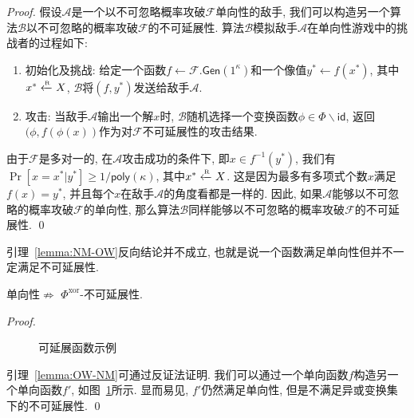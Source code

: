 \begin{proof}
假设$\mathcal{A}$是一个以不可忽略概率攻破$\mathcal{F}$单向性的敌手, 我们可以构造另一个算法$\mathcal{B}$以不可忽略的概率攻破$\mathcal{F}$的不可延展性. 算法$\mathcal{B}$模拟敌手$\mathcal{A}$在单向性游戏中的挑战者的过程如下: 
\begin{enumerate}
\item 初始化及挑战: 给定一个函数$f \leftarrow \mathcal{F}.\mathsf{Gen}(1^\kappa)$和一个像值$y^* \leftarrow f(x^*)$, 其中$x^* \xleftarrow{\textup{\tiny R}} X$, $\mathcal{B}$将$(f, y^*)$发送给敌手$\mathcal{A}$. 

\item 攻击: 当敌手$\mathcal{A}$输出一个解$x$时, $\mathcal{B}$随机选择一个变换函数$\phi \in \Phi \backslash \mathsf{id}$, 返回$(\phi, f(\phi(x))$作为对$\mathcal{F}$不可延展性的攻击结果.   
\end{enumerate}

由于$\mathcal{F}$是多对一的, 在$\mathcal{A}$攻击成功的条件下, 即$x \in f^{-1}(y^*)$, 我们有$\Pr[x = x^* |y^*] \geq 1/\mathsf{poly}(\kappa)$, 其中$x^* \xleftarrow{\textup{\tiny R}} X$. 这是因为最多有多项式个数$x$满足$f(x) = y^*$, 
并且每个$x$在敌手$\mathcal{A}$的角度看都是一样的. 因此, 如果$\mathcal{A}$能够以不可忽略的概率攻破$\mathcal{F}$的单向性, 那么算法$\mathcal{B}$同样能够以不可忽略的概率攻破$\mathcal{F}$的不可延展性. \qed    
\end{proof}

引理~\ref{lemma:NM-OW}反向结论并不成立, 也就是说一个函数满足单向性但并不一定满足不可延展性.
\begin{lemma}\label{lemma:OW-NM}
单向性$\nRightarrow$ $\Phi^{\text{xor}}$-不可延展性. 
\end{lemma}
\begin{proof}
\begin{figure}[!hbth]
\begin{center}
\end{center}
\caption{可延展函数示例}\label{fig:ch5-OW-NM}
\end{figure} 

引理~\ref{lemma:OW-NM}可通过反证法证明. 我们可以通过一个单向函数$f$构造另一个单向函数$f'$, 如图~\ref{fig:ch5-OW-NM}所示. 显而易见, $f'$仍然满足单向性, 但是不满足异或变换集下的不可延展性. \qed
\end{proof}

